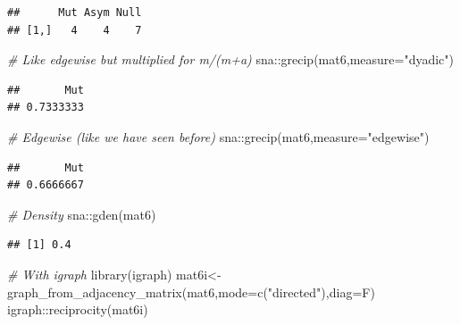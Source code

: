\documentclass[
  notitlepage,
  onecolumn,
  openany]{book}
\newenvironment{Shaded}{\begin{snugshade}}{\end{snugshade}}
\newcommand{\AttributeTok}[1]{\textcolor[rgb]{0.77,0.63,0.00}{#1}}
\newcommand{\CommentTok}[1]{\textcolor[rgb]{0.56,0.35,0.01}{\textit{#1}}}
\newcommand{\FunctionTok}[1]{\textcolor[rgb]{0.00,0.00,0.00}{#1}}
\newcommand{\NormalTok}[1]{#1}
\newcommand{\OtherTok}[1]{\textcolor[rgb]{0.56,0.35,0.01}{#1}}
\newcommand{\SpecialCharTok}[1]{\textcolor[rgb]{0.00,0.00,0.00}{#1}}
\newcommand{\StringTok}[1]{\textcolor[rgb]{0.31,0.60,0.02}{#1}}
\begin{document}
\begin{verbatim}
##      Mut Asym Null
## [1,]   4    4    7
\end{verbatim}

\begin{Shaded}
\begin{Highlighting}[]
\CommentTok{\# Like edgewise but multiplied for m/(m+a)}
\NormalTok{sna}\SpecialCharTok{::}\FunctionTok{grecip}\NormalTok{(mat6,}\AttributeTok{measure=}\StringTok{"dyadic"}\NormalTok{)}
\end{Highlighting}
\end{Shaded}

\begin{verbatim}
##       Mut 
## 0.7333333
\end{verbatim}

\begin{Shaded}
\begin{Highlighting}[]
\CommentTok{\# Edgewise (like we have seen before)}
\NormalTok{sna}\SpecialCharTok{::}\FunctionTok{grecip}\NormalTok{(mat6,}\AttributeTok{measure=}\StringTok{"edgewise"}\NormalTok{)}
\end{Highlighting}
\end{Shaded}

\begin{verbatim}
##       Mut 
## 0.6666667
\end{verbatim}

\begin{Shaded}
\begin{Highlighting}[]
\CommentTok{\# Density}
\NormalTok{sna}\SpecialCharTok{::}\FunctionTok{gden}\NormalTok{(mat6)}
\end{Highlighting}
\end{Shaded}

\begin{verbatim}
## [1] 0.4
\end{verbatim}

\begin{Shaded}
\begin{Highlighting}[]
\CommentTok{\# With igraph}
\FunctionTok{library}\NormalTok{(igraph)}
\NormalTok{mat6i}\OtherTok{\textless{}{-}}\FunctionTok{graph\_from\_adjacency\_matrix}\NormalTok{(mat6,}\AttributeTok{mode=}\FunctionTok{c}\NormalTok{(}\StringTok{"directed"}\NormalTok{),}\AttributeTok{diag=}\NormalTok{F)}
\NormalTok{igraph}\SpecialCharTok{::}\FunctionTok{reciprocity}\NormalTok{(mat6i)}
\end{Highlighting}
\end{Shaded}
\end{document}
